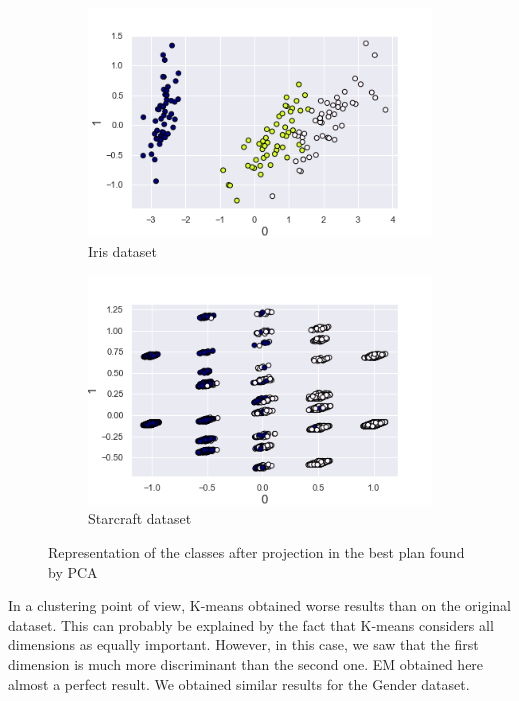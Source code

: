 \documentclass[twocolumn, 10pt]{article}
\begin{document}
			\begin{figure}[h]
				\centering
				\begin{subfigure}[t]{0.49\columnwidth}
					\centering
					\includegraphics[width=\linewidth]{../graphics/pca_iris_0_1_label.png}
					\caption{Iris dataset}
					\label{fig:pca_iris}
				\end{subfigure}
				\begin{subfigure}[t]{0.49\columnwidth}
					\centering
					\includegraphics[width=\linewidth]{../graphics/pca_g_0_1_label.png}
					\caption{Starcraft dataset}
					\label{fig:pca_g}
				\end{subfigure}
				\caption{Representation of the classes after projection in the best plan found by PCA}
				\label{fig:pca}
			\end{figure}

			In a clustering point of view, K-means obtained worse results than on the original dataset. This can probably be explained by the fact that K-means considers all dimensions as equally important. However, in this case, we saw that the first dimension is much more discriminant than the second one. EM obtained here almost a perfect result. We obtained similar results for the Gender dataset.
\end{document}
